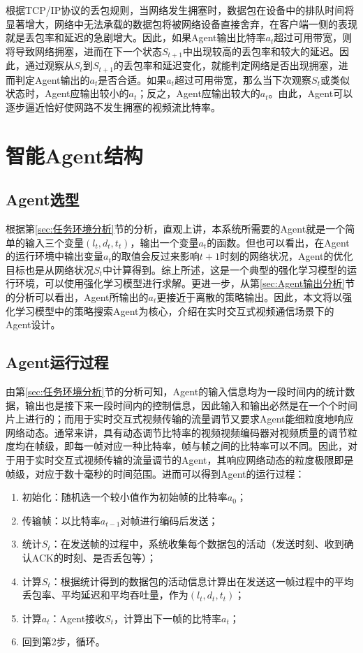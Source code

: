 \documentclass[a4paper]{ctexart}
\begin{document}
根据TCP/IP协议的丢包规则，当网络发生拥塞时，数据包在设备中的排队时间将显著增大，网络中无法承载的数据包将被网络设备直接舍弃，在客户端一侧的表现就是丢包率和延迟的急剧增大。因此，如果Agent输出比特率$a_t$超过可用带宽，则将导致网络拥塞，进而在下一个状态$S_{t+1}$中出现较高的丢包率和较大的延迟。因此，通过观察从$S_t$到$S_{t+1}$的丢包率和延迟变化，就能判定网络是否出现拥塞，进而判定Agent输出的$a_t$是否合适。如果$a_t$超过可用带宽，那么当下次观察$S_t$或类似状态时，Agent应输出较小的$a_t$；反之，Agent应输出较大的$a_t$。由此，Agent可以逐步逼近恰好使网路不发生拥塞的视频流比特率。

\section{智能Agent结构}

\subsection{Agent选型}

根据第\ref{sec:任务环境分析}节的分析，直观上讲，本系统所需要的Agent就是一个简单的输入三个变量$(l_t, d_t, t_t)$，输出一个变量$a_t$的函数。但也可以看出，在Agent的运行环境中输出变量$a_t$的取值会反过来影响$t+1$时刻的网络状况，Agent的优化目标也是从网络状况$S_t$中计算得到。综上所述，这是一个典型的强化学习模型的运行环境\cite{russell2002artificial}，可以使用强化学习模型进行求解。更进一步，从第\ref{sec:Agent输出分析}节的分析可以看出，Agent所输出的$a_t$更接近于离散的策略输出。因此，本文将以强化学习模型中的策略搜索Agent为核心，介绍在实时交互式视频通信场景下的Agent设计。

\subsection{Agent运行过程}

由第\ref{sec:任务环境分析}节的分析可知，Agent的输入信息均为一段时间内的统计数据，输出也是接下来一段时间内的控制信息，因此输入和输出必然是在一个个时间片上进行的；而用于实时交互式视频传输的流量调节又要求Agent能细粒度地响应网络动态。通常来讲，具有动态调节比特率的视频视频编码器对视频质量的调节粒度均在帧级，即每一帧对应一种比特率，帧与帧之间的比特率可以不同。因此，对于用于实时交互式视频传输的流量调节的Agent，其响应网络动态的粒度极限即是帧级，对应于数十毫秒的时间范围。进而可以得到Agent的运行过程：

\begin{enumerate}[label=\arabic*、]
	\item 初始化：随机选一个较小值作为初始帧的比特率$a_0$；
	\item 传输帧：以比特率$a_{t-1}$对帧进行编码后发送；
	\item 统计$S_t$：在发送帧的过程中，系统收集每个数据包的活动（发送时刻、收到确认ACK的时刻、是否丢包等）；
	\item 计算$S_t$：根据统计得到的数据包的活动信息计算出在发送这一帧过程中的平均丢包率、平均延迟和平均吞吐量，作为$(l_t, d_t, t_t)$；
	\item 计算$a_t$：Agent接收$S_t$，计算出下一帧的比特率$a_t$；
	\item 回到第2步，循环。
\end{enumerate}
\end{document}
